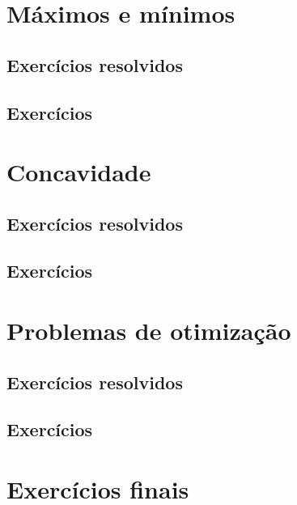 \section{Máximos e mínimos}
\construirSec

\subsection*{Exercícios resolvidos}

\construirExeresol


\subsection*{Exercícios}

\construirExer



\section{Concavidade}
\construirSec

\subsection*{Exercícios resolvidos}

\construirExeresol


\subsection*{Exercícios}

\construirExer


\section{Problemas de otimização}
\construirSec

\subsection*{Exercícios resolvidos}

\construirExeresol


\subsection*{Exercícios}

\construirExer


\section{Exercícios finais}

\construirExer


